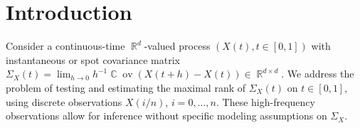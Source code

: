 \documentclass[preprint,aos]{imsart}
\numberwithin{equation}{section}
\theoremstyle{remark}
\DeclareMathOperator{\R}{{\mathbb R}}
\DeclareMathOperator{\C}{{\mathbb C}}
\providecommand{\COV}{\C\!\operatorname{ov}}
\begin{document}
\begin{frontmatter}
\begin{abstract}
\end{abstract}

\begin{keyword}[class=MSC2020]
\end{keyword}

\begin{keyword}
\end{keyword}


\end{frontmatter}

\section{Introduction}
Consider a continuous-time $\R^d$-valued process $(X(t),t\in[0,1])$ with  instantaneous or spot covariance matrix
$\Sigma_X(t)=\lim_{h\to  0}h^{-1}\COV(X(t+h)-X(t))\in\R^{d\times d}.$
We address the problem of testing and estimating the maximal rank of $\Sigma_X(t)$ on $t\in[0,1]$, using discrete observations $X(i/n)$, $i=0,\ldots,n$. These high-frequency observations allow for inference without specific modeling assumptions on $\Sigma_X$.
\end{document}
